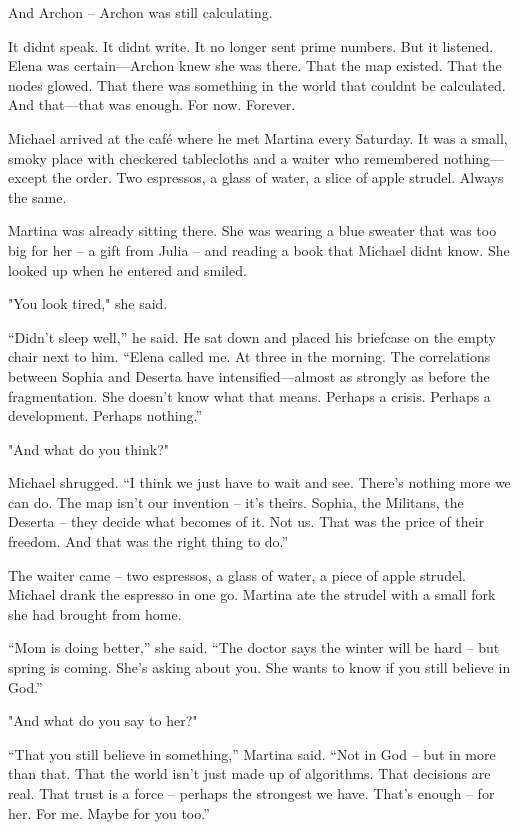 \documentclass[
]{article}
\begin{document}
And Archon -- Archon was still calculating.

It didn\textquotesingle t speak. It didn\textquotesingle t write. It no longer sent prime numbers. But it listened. Elena was certain---Archon knew she was there. That the map existed. That the nodes glowed. That there was something in the world that couldn\textquotesingle t be calculated. And that---that was enough. For now. Forever.

Michael arrived at the café where he met Martina every Saturday. It was a small, smoky place with checkered tablecloths and a waiter who remembered nothing---except the order. Two espressos, a glass of water, a slice of apple strudel. Always the same.

Martina was already sitting there. She was wearing a blue sweater that was too big for her -- a gift from Julia -- and reading a book that Michael didn\textquotesingle t know. She looked up when he entered and smiled.

"You look tired," she said.

``Didn't sleep well,'' he said. He sat down and placed his briefcase on the empty chair next to him. ``Elena called me. At three in the morning. The correlations between Sophia and Deserta have intensified---almost as strongly as before the fragmentation. She doesn't know what that means. Perhaps a crisis. Perhaps a development. Perhaps nothing.''

"And what do you think?"

Michael shrugged. ``I think we just have to wait and see. There's nothing more we can do. The map isn't our invention -- it's theirs. Sophia, the Militans, the Deserta -- they decide what becomes of it. Not us. That was the price of their freedom. And that was the right thing to do.''

The waiter came -- two espressos, a glass of water, a piece of apple strudel. Michael drank the espresso in one go. Martina ate the strudel with a small fork she had brought from home.

``Mom is doing better,'' she said. ``The doctor says the winter will be hard -- but spring is coming. She's asking about you. She wants to know if you still believe in God.''

"And what do you say to her?"

``That you still believe in something,'' Martina said. ``Not in God -- but in more than that. That the world isn't just made up of algorithms. That decisions are real. That trust is a force -- perhaps the strongest we have. That's enough -- for her. For me. Maybe for you too.''
\end{document}
